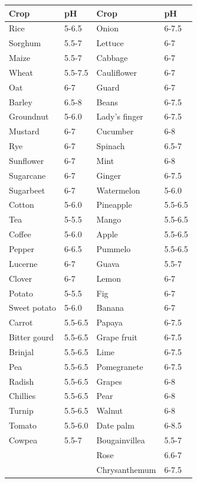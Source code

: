 \documentclass[
  openany]{book}
\begin{document}
\begin{longtable}{llll}
\toprule
Crop & pH & Crop & pH\\
\midrule
\rowcolor{gray!6}  Rice & 5-6.5 & Onion & 6-7.5\\
Sorghum & 5.5-7 & Lettuce & 6-7\\
\rowcolor{gray!6}  Maize & 5.5-7 & Cabbage & 6-7\\
Wheat & 5.5-7.5 & Cauliflower & 6-7\\
\rowcolor{gray!6}  Oat & 6-7 & Guard & 6-7\\
\addlinespace
Barley & 6.5-8 & Beans & 6-7.5\\
\rowcolor{gray!6}  Groundnut & 5-6.0 & Lady’s finger & 6-7.5\\
Mustard & 6-7 & Cucumber & 6-8\\
\rowcolor{gray!6}  Rye & 6-7 & Spinach & 6.5-7\\
Sunflower & 6-7 & Mint & 6-8\\
\addlinespace
\rowcolor{gray!6}  Sugarcane & 6-7 & Ginger & 6-7.5\\
Sugarbeet & 6-7 & Watermelon & 5-6.0\\
\rowcolor{gray!6}  Cotton & 5-6.0 & Pineapple & 5.5-6.5\\
Tea & 5-5.5 & Mango & 5.5-6.5\\
\rowcolor{gray!6}  Coffee & 5-6.0 & Apple & 5.5-6.5\\
\addlinespace
Pepper & 6-6.5 & Pummelo & 5.5-6.5\\
\rowcolor{gray!6}  Lucerne & 6-7 & Guava & 5.5-7\\
Clover & 6-7 & Lemon & 6-7\\
\rowcolor{gray!6}  Potato & 5-5.5 & Fig & 6-7\\
Sweet potato & 5-6.0 & Banana & 6-7\\
\addlinespace
\rowcolor{gray!6}  Carrot & 5.5-6.5 & Papaya & 6-7.5\\
Bitter gourd & 5.5-6.5 & Grape fruit & 6-7.5\\
\rowcolor{gray!6}  Brinjal & 5.5-6.5 & Lime & 6-7.5\\
Pea & 5.5-6.5 & Pomegranete & 6-7.5\\
\rowcolor{gray!6}  Radish & 5.5-6.5 & Grapes & 6-8\\
\addlinespace
Chillies & 5.5-6.5 & Pear & 6-8\\
\rowcolor{gray!6}  Turnip & 5.5-6.5 & Walnut & 6-8\\
Tomato & 5.5-6.0 & Date palm & 6-8.5\\
\rowcolor{gray!6}  Cowpea & 5.5-7 & Bougainvillea & 5.5-7\\
 &  & Rose & 6.6-7\\
\addlinespace
\rowcolor{gray!6}   &  & Chrysanthemum & 6-7.5\\
\bottomrule
\end{longtable}
\endgroup{}
\end{document}
